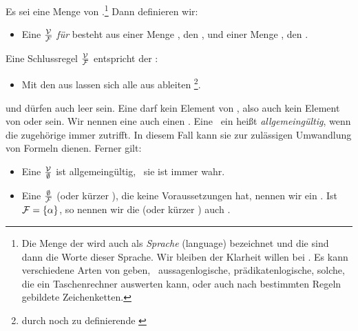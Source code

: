 Es sei \objqt{\Formelmenge} eine Menge von .\footnote{%
	Die Menge der  wird auch als \emph{Sprache} (language) bezeichnet und die  sind dann die Worte dieser Sprache.
	Wir bleiben der Klarheit willen bei .\newline
	Es kann verschiedene Arten von  geben, \textzB\ aussagenlogische, prädikatenlogische, solche, die ein Taschenrechner auswerten kann, oder auch nach bestimmten Regeln gebildete Zeichenketten.%
}
Dann definieren wir:
\begin{itemize}
	\item[] Eine \emph{} $\frac{\mathcal{V}}{\mathcal{F}}$ \emph{für} \objqt{\Formelmenge} besteht aus einer Menge \objqt{\Voraussetzungsmenge \subseteq \Formelmenge}, den , und einer Menge \objqt{\Folgerungsmenge \subseteq \Formelmenge}, den .
\end{itemize}
Eine Schlussregel $\frac{\mathcal{V}}{\mathcal{F}}$ entspricht der :
%
\begin{itemize}
	\item[] Mit den  aus \objqt{\Voraussetzungsmenge} lassen sich alle  aus \objqt{\Folgerungsmenge} ableiten%
	\footnote{durch noch zu definierende \emph{}}.
\end{itemize}
%
\objqt{\Voraussetzungsmenge} und \objqt{\Folgerungsmenge} dürfen auch leer sein.
Eine  darf kein Element von \objqt{\Formelmenge}, also auch kein Element von \objqt{\Voraussetzungsmenge} oder \objqt{\Folgerungsmenge} sein.
Wir nennen eine  auch einen \emph{}.
Eine  \textbzw\ ein  heißt \emph{allgemeingültig}, wenn die zugehörige  immer zutrifft.
In diesem Fall kann sie zur zulässigen Umwandlung von Formeln dienen.
Ferner gilt:
%
\begin{itemize}
	\item Eine  $\frac{\mathcal{V}}{\emptyset}$ ist allgemeingültig, \textdh\ sie ist immer wahr.
	\item Eine  $\frac{\emptyset}{\mathcal{F}}$ (oder kürzer \objqt{\Folgerungsmenge}), die keine Voraussetzungen hat, nennen wir ein \emph{}.
	Ist $\mathcal{F} = \{\alpha\}$, so nennen wir die  (oder kürzer \objqt{\alpha}) auch \emph{}.
\end{itemize}

